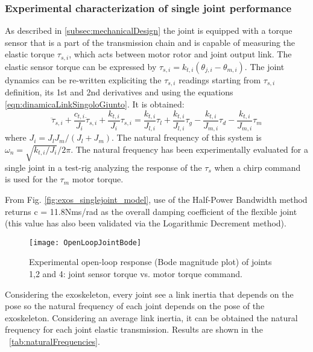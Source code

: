 \subsubsection{Experimental characterization of single joint performance}
As described in \ref{subsec:mechanicalDesign} the joint is equipped with a torque sensor that is a part of the transmission chain and is capable of measuring the elastic torque $\tau_{s,i}$, which acts between motor rotor and joint output link. The elastic sensor torque can be expressed by $\tau_{s,i} = k_{t,i} (\theta_{j,i}-\theta_{m,i})$. The joint dynamics can be re-written expliciting the $\tau_{s,i}$ readings starting from  $\tau_{s,i}$ definition, its 1st and 2nd derivatives and using the equations  \ref{eqn:dinamicaLinkSingoloGiunto}. It is obtained:
\begin{equation}
\label{eqn:dinamicaSensoreCoppia}
\ddot{\tau}_{s,i} + \frac{c_{t,i}}{J_i}\dot{\tau}_{s,i} + \frac{k_{t,i}}{J_i}\tau_{s,i}= \frac{k_{t,i}}{J_{l,i}}\tau_l + \frac{k_{t,i}}{J_{l,i}}\tau_g - \frac{k_{t,i}}{J_{m,i}}\tau_d - \frac{k_{t,i}}{J_{m,i}}\tau_m
\end{equation}
where $J_i = J_l J_m /(J_l+J_m)$. The natural frequency of this system is $\omega_n = \sqrt{k_{t,i} /J_i } /2\pi$. The natural frequency has been experimentally evaluated for a single joint in a test-rig analyzing the response of the $\tau_s$ when a chirp command is used for the $\tau_m$ motor torque. 
\par From Fig. \ref{fig:exos_singlejoint_model}, use of the Half-Power Bandwidth method returns c = 11.8Nms/rad as the overall damping coefficient of the flexible joint (this value has also been validated via the Logarithmic Decrement method).
\begin{figure}[ht]
	\centering
	\texttt{[image: OpenLoopJointBode]}
	\caption{Experimental open-loop response (Bode magnitude plot) of joints 1,2 and 4: joint sensor torque vs. motor torque command.}
	\label{fig:OpenLoopJointBode}
\end{figure}
Considering the exoskeleton, every joint see a link inertia that depends on the pose so the natural frequency of each joint depends on the pose of the exoskeleton. 
Considering an average link inertia, it can be obtained the natural frequency for each joint elastic transmission. Results are shown in the \tablename \ \ref{tab:naturalFrequencies}.

